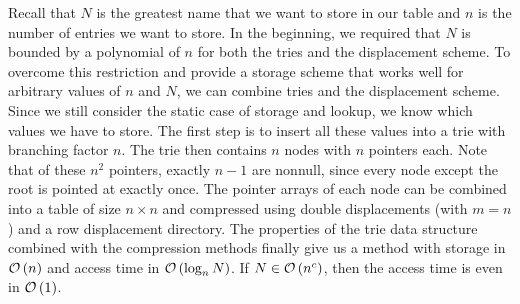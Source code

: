 Recall that $N$ is the greatest name that we want to store in our table and $n$ is the number of entries we want to store.
In the beginning, we required that $N$ is bounded by a polynomial of $n$ for both the tries and the displacement scheme.
To overcome this restriction and provide a storage scheme that works well for arbitrary values of $n$ and $N$, we can combine tries and the displacement scheme.
Since we still consider the static case of storage and lookup, we know which values we have to store.
The first step is to insert all these values into a trie with branching factor $n$.
The trie then contains $n$ nodes with $n$ pointers each.
Note that of these $n^2$ pointers, exactly $n - 1$ are nonnull, since every node except the root is pointed at exactly once.
The pointer arrays of each node can be combined into a table of size $n \times n$ and compressed using double displacements (with $m = n$) and a row displacement directory.
The properties of the trie data structure combined with the compression methods finally give us a method with storage in $\mathcal{O}\left(n\right)$ and access time in $\mathcal{O}\left(\log_n N\right)$.
If $N \in \mathcal{O}\left(n^c\right)$, then the access time is even in $\mathcal{O}\left(1\right)$.
